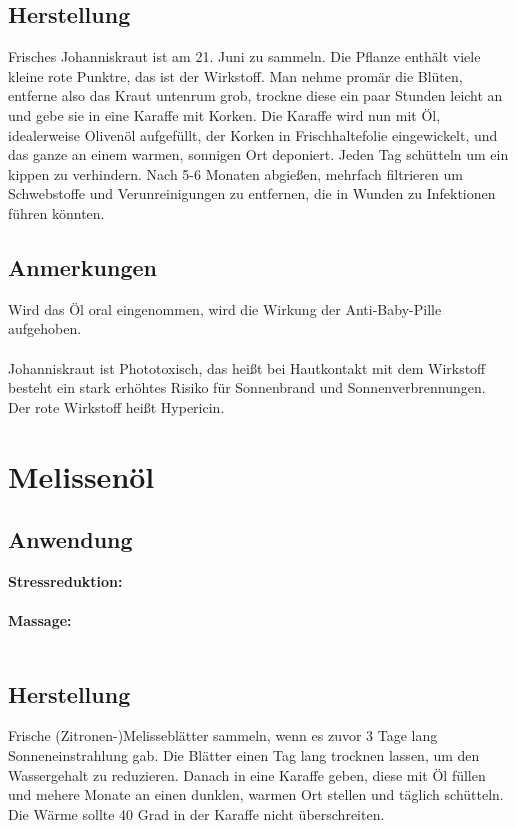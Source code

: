 \subsection{Herstellung}

Frisches Johanniskraut ist am 21. Juni zu sammeln. Die Pflanze enthält viele kleine rote Punktre, das ist der Wirkstoff. Man nehme promär die Blüten, entferne also das Kraut untenrum grob, trockne diese ein paar Stunden leicht an und gebe sie in eine Karaffe mit Korken. Die Karaffe wird nun mit Öl, idealerweise Olivenöl aufgefüllt, der Korken in Frischhaltefolie eingewickelt, und das ganze an einem warmen, sonnigen Ort deponiert. Jeden Tag schütteln um ein kippen zu verhindern. Nach 5-6 Monaten abgießen, mehrfach filtrieren um Schwebstoffe und Verunreinigungen zu entfernen, die in Wunden zu Infektionen führen könnten.

\subsection{Anmerkungen}

Wird das Öl oral eingenommen, wird die Wirkung der Anti-Baby-Pille aufgehoben.\\ \\
Johanniskraut ist Phototoxisch, das heißt bei Hautkontakt mit dem Wirkstoff besteht ein stark erhöhtes Risiko für Sonnenbrand und Sonnenverbrennungen.\\
Der rote Wirkstoff heißt Hypericin.


\section{Melissenöl}

\subsection{Anwendung}

\textbf{Stressreduktion:} \\ \\
\textbf{Massage:} \\ \\


\subsection{Herstellung}

Frische (Zitronen-)Melisseblätter sammeln, wenn es zuvor 3 Tage lang Sonneneinstrahlung gab. Die Blätter einen Tag lang trocknen lassen, um den Wassergehalt zu reduzieren. Danach in eine Karaffe geben, diese mit Öl füllen und mehere Monate an einen dunklen, warmen Ort stellen und täglich schütteln. Die Wärme sollte 40 Grad in der Karaffe nicht überschreiten.

